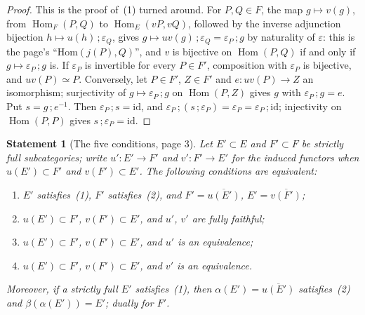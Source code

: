 \documentclass[11pt]{article}
\newcommand{\q}[1]{“#1”}
\theoremstyle{plain}
\newtheorem*{enonce}{Statement}
\theoremstyle{definition}
\theoremstyle{remark}
\begin{document}
\begin{proof}
This is the proof of~(1) turned around. For $P, Q \in F$, the map $g \mapsto v(g)$, from $\operatorname{Hom}_F(P, Q)$ to $\operatorname{Hom}_E(vP, vQ)$, followed by the inverse adjunction bijection $h \mapsto u(h)\,;\varepsilon_Q$, gives $g \mapsto uv(g)\,;\varepsilon_Q = \varepsilon_P\,;g$ by naturality of $\varepsilon$: this is the page's \q{$\mathrm{Hom}(j(P), Q)$}, and $v$ is bijective on $\operatorname{Hom}(P, Q)$ if and only if $g \mapsto \varepsilon_P\,;g$ is. If $\varepsilon_P$ is invertible for every $P \in F'$, composition with $\varepsilon_P$ is bijective, and $uv(P) \simeq P$. Conversely, let $P \in F'$, $Z \in F'$ and $e : uv(P) \to Z$ an isomorphism; surjectivity of $g \mapsto \varepsilon_P\,;g$ on $\operatorname{Hom}(P, Z)$ gives $g$ with $\varepsilon_P\,;g = e$. Put $s = g\,;e^{-1}$. Then $\varepsilon_P\,;s = \mathrm{id}$, and $\varepsilon_P\,;(s\,;\varepsilon_P) = \varepsilon_P = \varepsilon_P\,;\mathrm{id}$; injectivity on $\operatorname{Hom}(P, P)$ gives $s\,;\varepsilon_P = \mathrm{id}$.
\end{proof}

\begin{enonce}[The five conditions, page 3]
Let $E' \subset E$ and $F' \subset F$ be strictly full subcategories; write $u' : E' \to F'$ and $v' : F' \to E'$ for the induced functors when $u(E') \subset F'$ and $v(F') \subset E'$. The following conditions are equivalent:
\begin{enumerate}
\item $E'$ satisfies~(1), $F'$ satisfies~(2), and $F' = \overline{u(E')}$, $E' = \overline{v(F')}$;
\item $u(E') \subset F'$, $v(F') \subset E'$, and $u'$, $v'$ are fully faithful;
\item $u(E') \subset F'$, $v(F') \subset E'$, and $u'$ is an equivalence;
\item $u(E') \subset F'$, $v(F') \subset E'$, and $v'$ is an equivalence.
\end{enumerate}
Moreover, if a strictly full $E'$ satisfies~(1), then $\alpha(E') = \overline{u(E')}$ satisfies~(2) and $\beta(\alpha(E')) = E'$; dually for $F'$.
\end{enonce}
\end{document}
